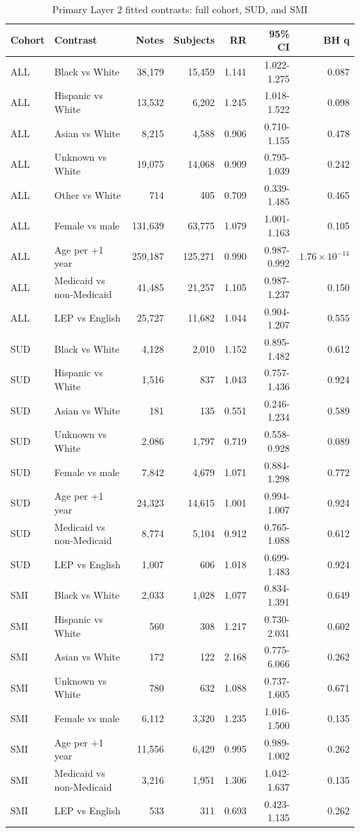 \documentclass[unnumsec,webpdf,contemporary,large]{oup-authoring-template}
\begin{document}
\begin{table}[H]
\caption{Primary Layer 2 fitted contrasts: full cohort, SUD, and SMI}
\label{tab:s_layer2a}
\centering
\small
\begin{tabular}{llrrrrr}
\toprule
Cohort & Contrast & Notes & Subjects & RR & 95\% CI & BH q \\
\midrule
ALL & Black vs White & 38,179 & 15,459 & 1.141 & 1.022-1.275 & 0.087 \\
ALL & Hispanic vs White & 13,532 & 6,202 & 1.245 & 1.018-1.522 & 0.098 \\
ALL & Asian vs White & 8,215 & 4,588 & 0.906 & 0.710-1.155 & 0.478 \\
ALL & Unknown vs White & 19,075 & 14,068 & 0.909 & 0.795-1.039 & 0.242 \\
ALL & Other vs White & 714 & 405 & 0.709 & 0.339-1.485 & 0.465 \\
ALL & Female vs male & 131,639 & 63,775 & 1.079 & 1.001-1.163 & 0.105 \\
ALL & Age per +1 year & 259,187 & 125,271 & 0.990 & 0.987-0.992 & \(1.76\times10^{-14}\) \\
ALL & Medicaid vs non-Medicaid & 41,485 & 21,257 & 1.105 & 0.987-1.237 & 0.150 \\
ALL & LEP vs English & 25,727 & 11,682 & 1.044 & 0.904-1.207 & 0.555 \\
SUD & Black vs White & 4,128 & 2,010 & 1.152 & 0.895-1.482 & 0.612 \\
SUD & Hispanic vs White & 1,516 & 837 & 1.043 & 0.757-1.436 & 0.924 \\
SUD & Asian vs White & 181 & 135 & 0.551 & 0.246-1.234 & 0.589 \\
SUD & Unknown vs White & 2,086 & 1,797 & 0.719 & 0.558-0.928 & 0.089 \\
SUD & Female vs male & 7,842 & 4,679 & 1.071 & 0.884-1.298 & 0.772 \\
SUD & Age per +1 year & 24,323 & 14,615 & 1.001 & 0.994-1.007 & 0.924 \\
SUD & Medicaid vs non-Medicaid & 8,774 & 5,104 & 0.912 & 0.765-1.088 & 0.612 \\
SUD & LEP vs English & 1,007 & 606 & 1.018 & 0.699-1.483 & 0.924 \\
SMI & Black vs White & 2,033 & 1,028 & 1.077 & 0.834-1.391 & 0.649 \\
SMI & Hispanic vs White & 560 & 308 & 1.217 & 0.730-2.031 & 0.602 \\
SMI & Asian vs White & 172 & 122 & 2.168 & 0.775-6.066 & 0.262 \\
SMI & Unknown vs White & 780 & 632 & 1.088 & 0.737-1.605 & 0.671 \\
SMI & Female vs male & 6,112 & 3,320 & 1.235 & 1.016-1.500 & 0.135 \\
SMI & Age per +1 year & 11,556 & 6,429 & 0.995 & 0.989-1.002 & 0.262 \\
SMI & Medicaid vs non-Medicaid & 3,216 & 1,951 & 1.306 & 1.042-1.637 & 0.135 \\
SMI & LEP vs English & 533 & 311 & 0.693 & 0.423-1.135 & 0.262 \\
\bottomrule
\end{tabular}
\end{table}
\end{document}
